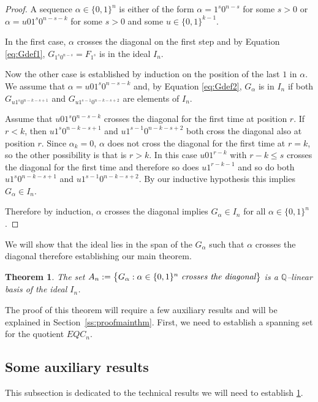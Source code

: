 \documentclass[11pt]{amsart}
\newtheorem{theorem}{Theorem}[section]
\theoremstyle{definition}
\numberwithin{equation}{section}
\begin{document}
\begin{proof}
A sequence $\alpha \in \{ 0, 1\}^n$ is either of the form
$\alpha = 1^s0^{n-s}$ for some $s > 0$ or
$\alpha = u01^s0^{n-s-k}$ for some $s>0$ and some $u \in \{0,1\}^{k-1}$.

In the first case, $\alpha$ crosses the diagonal on the first step and
by Equation \eqref{eq:Gdef1}, $G_{1^s0^{n-s}} = F_{1^s}$
is in the ideal $I_n$.

Now the other case is established by
induction on the position of the last $1$ in $\alpha$.
We assume that
$\alpha = u01^s0^{n-s-k}$ and, by Equation \eqref{eq:Gdef2},
$G_\alpha$ is in $I_n$ if both
$G_{u1^s0^{n-k-s+1}}$ and $G_{u1^{s-1}0^{n-k-s+2}}$
are elements of $I_n$.

Assume that $u01^s0^{n-s-k}$
crosses the diagonal for the first time at position $r$.
If $r<k$, then
$u1^s0^{n-k-s+1}$ and $u1^{s-1}0^{n-k-s+2}$
both cross the diagonal also at position $r$.
Since $\alpha_k=0$, $\alpha$ does not cross the diagonal for the first
time at $r=k$, so the other possibility is that is $r>k$.
In this case $u01^{r-k}$ with $r-k \leq s$ crosses the diagonal for the first time
and therefore so does $u1^{r-k-1}$ and so do both
$u1^s0^{n-k-s+1}$ and $u1^{s-1}0^{n-k-s+2}$.
By our inductive hypothesis this implies $G_\alpha \in I_n$.

Therefore by induction, $\alpha$ crosses the diagonal implies $G_\alpha \in I_n$
for all $\alpha \in \{0,1\}^n$.
\end{proof}

We will  show that the ideal lies in the span of the $G_\alpha$ such
that $\alpha$ crosses the diagonal therefore establishing our main theorem.

\begin{theorem}\label{thm:basisofideal} 
The set $A_n:=\big\{ G_\alpha : \alpha \in \{0,1\}^n \text{ \it crosses the diagonal}\big\}$
is a $\mathbb Q$--linear basis of the ideal $I_n$.
\end{theorem}

The proof of this theorem will require a few auxiliary results and will be explained
in Section~\ref{ss:proofmainthm}.
First, we need to establish a spanning set for the quotient $EQC_n$.


\subsection{Some auxiliary results} This subsection is dedicated to the technical results we will need
to establish \ref{thm:basisofideal}.
\end{document}
